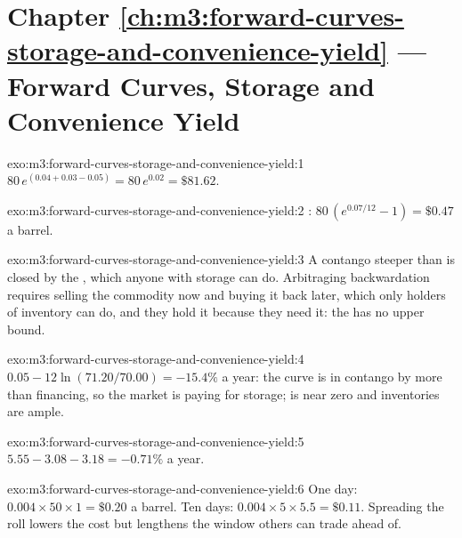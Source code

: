 \section*{Chapter \ref{ch:m3:forward-curves-storage-and-convenience-yield} --- Forward Curves, Storage and Convenience Yield}

\begin{solution}{exo:m3:forward-curves-storage-and-convenience-yield:1}
$80\,e^{(0.04 + 0.03 - 0.05)} = 80\,e^{0.02} = \$81.62$.
\end{solution}

\begin{solution}{exo:m3:forward-curves-storage-and-convenience-yield:2}
: $80\,(e^{0.07/12} - 1) = \$0.47$ a barrel.
\end{solution}

\begin{solution}{exo:m3:forward-curves-storage-and-convenience-yield:3}
A contango steeper than  is closed by the , which anyone with storage can
do. Arbitraging backwardation requires selling the commodity now and buying it back later, which only
holders of inventory can do, and they hold it because they need it: the  has no upper
bound.
\end{solution}

\begin{solution}{exo:m3:forward-curves-storage-and-convenience-yield:4}
$0.05 - 12\ln(71.20/70.00) = -15.4\%$ a year: the curve is in contango by more than financing, so the
market is paying for storage;  is near zero and inventories are ample.
\end{solution}

\begin{solution}{exo:m3:forward-curves-storage-and-convenience-yield:5}
$5.55 - 3.08 - 3.18 = -0.71\%$ a year.
\end{solution}

\begin{solution}{exo:m3:forward-curves-storage-and-convenience-yield:6}
One day: $0.004 \times 50 \times 1 = \$0.20$ a barrel. Ten days: $0.004 \times 5 \times 5.5 = \$0.11$.
Spreading the roll lowers the cost but lengthens the window others can trade ahead of.
\end{solution}

